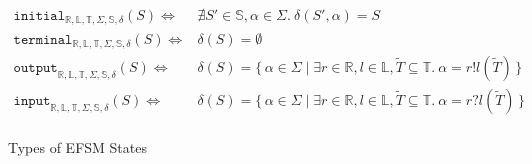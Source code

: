 \begin{figure}[!hb]
\doublespacing
\[
\begin{array}{rl}

\texttt{initial}_{\mathbb{R}, \mathbb{L}, \mathbb{T}, \Sigma, \mathbb{S}, \delta}(S) \iff & \nexists S' \in \mathbb{S},\alpha \in \Sigma.~\delta(S',\alpha) = S \\
\texttt{terminal}_{\mathbb{R}, \mathbb{L}, \mathbb{T}, \Sigma, \mathbb{S}, \delta}(S) \iff & \delta(S) = \emptyset \\
\texttt{output}_{\mathbb{R}, \mathbb{L}, \mathbb{T}, \Sigma, \mathbb{S}, \delta}(S) \iff & \delta(S) = \{\,\alpha \in \Sigma \mid \exists r \in \mathbb{R}, l \in \mathbb{L}, \tilde{T} \subseteq{\mathbb{T}}.~\alpha = r!l(\tilde{T})\,\} \\
\texttt{input}_{\mathbb{R}, \mathbb{L}, \mathbb{T}, \Sigma, \mathbb{S}, \delta}(S) \iff & \delta(S) = \{\,\alpha \in \Sigma \mid \exists r \in \mathbb{R}, l \in \mathbb{L}, \tilde{T} \subseteq{\mathbb{T}}.~\alpha = r?l(\tilde{T})\,\} \\
\end{array}
\]
\singlespacing
\caption{Types of EFSM States}
\end{figure}
